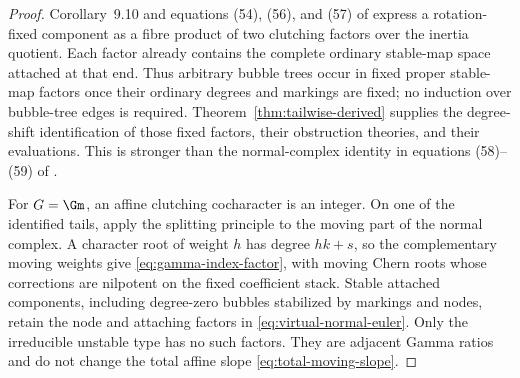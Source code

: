 \begin{proof}
Corollary~9.10 and equations (54), (56), and (57) of
\cite{WoodwardQKIII} express a rotation-fixed component as a fibre product of
two clutching factors over the inertia quotient.  Each factor already
contains the complete ordinary stable-map space attached at that end.  Thus
arbitrary bubble trees occur in fixed proper stable-map factors once their
ordinary degrees and markings are fixed; no induction over bubble-tree edges
is required.  Theorem~\ref{thm:tailwise-derived} supplies the degree-shift
identification of those fixed factors, their obstruction theories, and their
evaluations.  This is stronger than the normal-complex identity in equations
(58)--(59) of \cite{WoodwardQKIII}.

For \(G=\Gm\), an affine clutching cocharacter is an integer.  On one of the
identified tails, apply the splitting principle to the moving part of the
normal complex.  A character root of weight \(h\) has degree \(hk+s\), so
the complementary moving weights give \eqref{eq:gamma-index-factor}, with
moving Chern roots whose corrections are nilpotent on
the fixed coefficient stack.  Stable attached components, including
degree-zero bubbles stabilized by markings and nodes, retain the node and
attaching factors in \eqref{eq:virtual-normal-euler}.  Only the irreducible
unstable type has no such
factors.  They are adjacent Gamma ratios and do not change the total affine
slope \eqref{eq:total-moving-slope}.


\end{proof}

